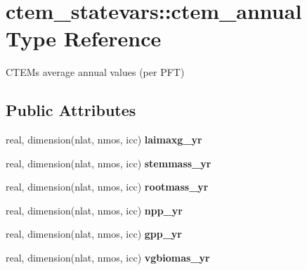 \hypertarget{structctem__statevars_1_1ctem__annual}{}\section{ctem\+\_\+statevars\+:\+:ctem\+\_\+annual Type Reference}
\label{structctem__statevars_1_1ctem__annual}


C\+T\+E\+M\textquotesingle{}s average annual values (per P\+F\+T)  


\subsection*{Public Attributes}
\begin{DoxyCompactItemize}
\item 
\hypertarget{structctem__statevars_1_1ctem__annual_a70769df94865cfe0583df37558ab0739}{}real, dimension(nlat, nmos, icc) {\bfseries laimaxg\+\_\+yr}\label{structctem__statevars_1_1ctem__annual_a70769df94865cfe0583df37558ab0739}

\item 
\hypertarget{structctem__statevars_1_1ctem__annual_a7957999e054c10aee42a894ae806bc2d}{}real, dimension(nlat, nmos, icc) {\bfseries stemmass\+\_\+yr}\label{structctem__statevars_1_1ctem__annual_a7957999e054c10aee42a894ae806bc2d}

\item 
\hypertarget{structctem__statevars_1_1ctem__annual_acb56ce156fc016da6683e862c6de40a3}{}real, dimension(nlat, nmos, icc) {\bfseries rootmass\+\_\+yr}\label{structctem__statevars_1_1ctem__annual_acb56ce156fc016da6683e862c6de40a3}

\item 
\hypertarget{structctem__statevars_1_1ctem__annual_a11ee3f4dcc653707399fc76854108263}{}real, dimension(nlat, nmos, icc) {\bfseries npp\+\_\+yr}\label{structctem__statevars_1_1ctem__annual_a11ee3f4dcc653707399fc76854108263}

\item 
\hypertarget{structctem__statevars_1_1ctem__annual_a75c9860dd56f1aef40921cd307daf150}{}real, dimension(nlat, nmos, icc) {\bfseries gpp\+\_\+yr}\label{structctem__statevars_1_1ctem__annual_a75c9860dd56f1aef40921cd307daf150}

\item 
\hypertarget{structctem__statevars_1_1ctem__annual_adcedd54f7d039ff4fee6807f04f00cad}{}real, dimension(nlat, nmos, icc) {\bfseries vgbiomas\+\_\+yr}\label{structctem__statevars_1_1ctem__annual_adcedd54f7d039ff4fee6807f04f00cad}


\end{DoxyCompactItemize}
